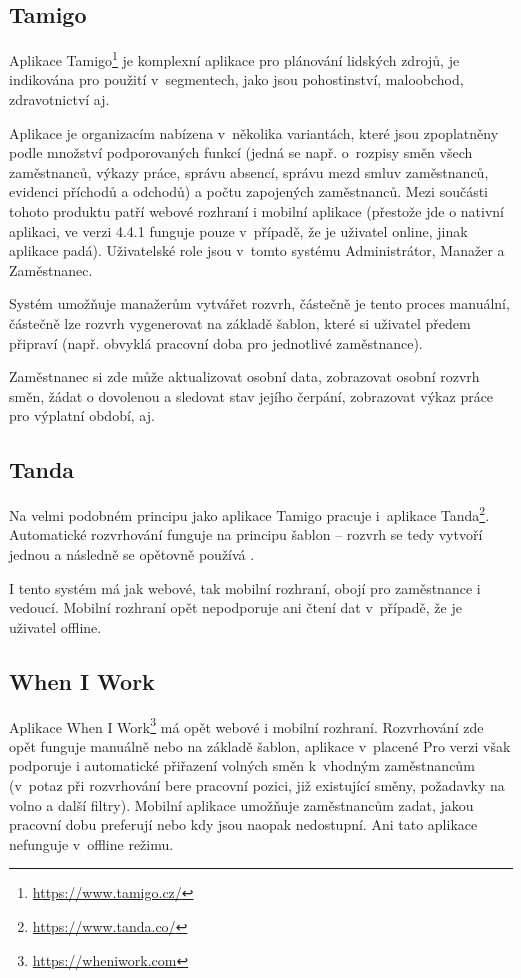 \documentclass[twoside]{ctuthesis}
\begin{document}
\subsection{Tamigo}
Aplikace Tamigo\footnote{\url{https://www.tamigo.cz/}} je komplexní aplikace pro plánování lidských zdrojů, je indikována pro použití v~segmentech, jako jsou pohostinství, maloobchod, zdravotnictví aj. \cite{tamigo2020reseni}

Aplikace je organizacím nabízena v~několika variantách, které jsou zpop\-lat\-ně\-ny podle množství podporovaných funkcí (jedná se např. o~rozpisy směn všech zaměstnanců, výkazy práce, správu absencí, správu mezd smluv zaměstnanců, evidenci příchodů a odchodů) a počtu zapojených zaměstnanců. Mezi součásti tohoto produktu patří webové rozhraní i mobilní aplikace (přestože jde o nativní aplikaci, ve verzi 4.4.1 funguje pouze v~případě, že je uživatel online, jinak aplikace padá). Uživatelské role jsou v~tomto systému Administrátor, Manažer a Zaměstnanec.

Systém umožňuje manažerům vytvářet rozvrh, částečně je tento proces manuální, částečně lze rozvrh vygenerovat na základě šablon, které si uživatel předem připraví (např. obvyklá pracovní doba pro jednotlivé zaměstnance). %

Za\-měst\-na\-nec si zde může aktualizovat osobní data, zobrazovat osobní rozvrh směn, žádat o dovolenou a sledovat stav jejího čerpání, zobrazovat výkaz práce pro výplatní období, aj.

\subsection{Tanda}
Na velmi podobném principu jako aplikace Tamigo pracuje i~aplikace Tanda\footnote{\url{https://www.tanda.co/}}. Automatické rozvrhování funguje na principu šablon -- rozvrh se tedy vytvoří jednou a následně se opětovně používá \cite{tanda2020rosters}.

I tento systém má jak webové, tak mobilní rozhraní, obojí pro zaměstnance i vedoucí. Mobilní rozhraní opět nepodporuje ani čtení dat v~případě, že je uživatel offline.

\subsection{When I Work}
Aplikace When I Work\footnote{\url{https://wheniwork.com}} má opět webové i mobilní rozhraní. Rozvrhování zde opět funguje manuálně nebo na základě šablon, aplikace v~placené Pro verzi \cite{wheinwork2020pricing} však podporuje i automatické přiřazení volných směn k~vhodným zaměstnancům (v~potaz při rozvrhování bere pracovní pozici, již existující směny, požadavky na volno a další filtry). \cite{wheinwork2020employee} Mobilní aplikace umožňuje zaměstnancům zadat, jakou pracovní dobu preferují nebo kdy jsou naopak nedostupní. Ani tato aplikace nefunguje v~offline režimu.
\end{document}
